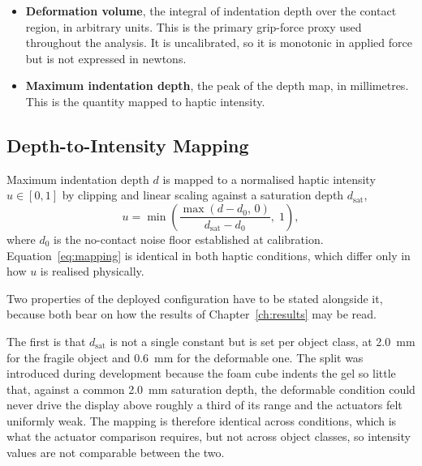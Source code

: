 \documentclass[12pt, a4paper, twoside, openright]{report}
\begin{document}
\begin{itemize}
    \item \textbf{Deformation volume}, the integral of indentation depth over
          the contact region, in arbitrary units. This is the primary
          grip-force proxy used throughout the analysis. It is uncalibrated, so
          it is monotonic in applied force but is not expressed in newtons.
    \item \textbf{Maximum indentation depth}, the peak of the depth map, in
          millimetres. This is the quantity mapped to haptic intensity.
\end{itemize}

\subsection{Depth-to-Intensity Mapping}
\label{subsec:mapping}

Maximum indentation depth $d$ is mapped to a normalised haptic intensity
$u \in [0,1]$ by clipping and linear scaling against a saturation depth
$d_{\text{sat}}$,
\begin{equation}
    u = \min\!\left(\frac{\max(d - d_0,\, 0)}{d_{\text{sat}} - d_0},\; 1\right),
    \label{eq:mapping}
\end{equation}
where $d_0$ is the no-contact noise floor established at calibration.
Equation~\eqref{eq:mapping} is identical in both haptic conditions, which
differ only in how $u$ is realised physically.

Two properties of the deployed configuration have to be stated alongside it,
because both bear on how the results of Chapter~\ref{ch:results} may be read.

The first is that $d_{\text{sat}}$ is not a single constant but is set per
object class, at \SI{2.0}{\milli\metre} for the fragile object and
\SI{0.6}{\milli\metre} for the deformable one. The split was introduced during
development because the foam cube indents the gel so little that, against a
common \SI{2.0}{\milli\metre} saturation depth, the deformable condition could
never drive the display above roughly a third of its range and the actuators
felt uniformly weak. The mapping is therefore identical across conditions,
which is what the actuator comparison requires, but not across object classes,
so intensity values are not comparable between the two.
\end{document}
